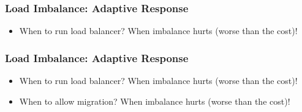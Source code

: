 \begin{frame}
\frametitle{Load Imbalance: Adaptive Response}
\begin{itemize}
\item When to run load balancer? \pause When imbalance hurts (worse than the cost)!
\end{itemize}
\end{frame}

\begin{frame}
\frametitle{Load Imbalance: Adaptive Response}
\begin{itemize}
\item When to run load balancer? When imbalance hurts (worse than the cost)!
\item When to allow migration? \pause When imbalance hurts (worse than the cost)!
\end{itemize}
\end{frame}
